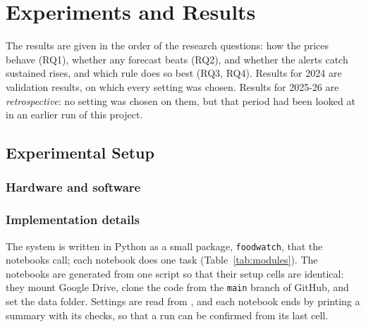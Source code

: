 \chapter{Experiments and Results}\label{ch:results}

The results are given in the order of the research questions: how the prices behave (RQ1), whether any forecast beats \naive{} (RQ2), and whether the alerts catch sustained rises, and which rule does so best (RQ3, RQ4). Results for 2024 are validation results, on which every setting was chosen. Results for 2025-26 are \emph{retrospective}: no setting was chosen on them, but that period had been looked at in an earlier run of this project.

\section{Experimental Setup}

\subsection{Hardware and software}
\begin{table}[H]\centering\small
\caption[Hardware]{Hardware used.}\label{tab:hardware}
\fittab{}
\end{table}

\begin{table}[H]\centering\small
\caption[Software]{Software used.}\label{tab:software}
\fittab{}
\end{table}

\subsection{Implementation details}
The system is written in Python as a small package, \texttt{foodwatch}, that the notebooks call; each notebook does one task (Table~\ref{tab:modules}). The notebooks are generated from one script so that their setup cells are identical: they mount Google Drive, clone the code from the \texttt{main} branch of GitHub, and set the data folder. Settings are read from , and each notebook ends by printing a summary with its checks, so that a run can be confirmed from its last cell.

